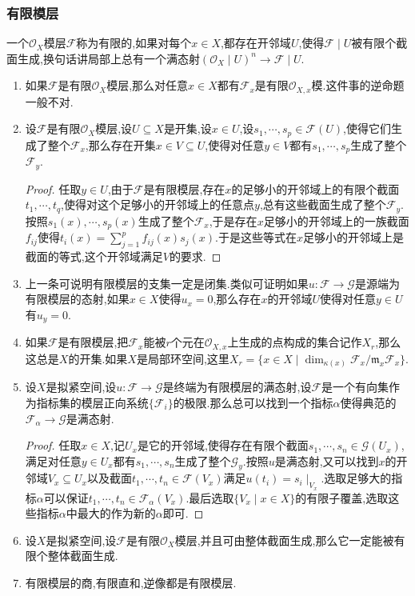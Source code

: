 \subsubsection{有限模层}

一个$\mathscr{O}_X$模层$\mathscr{F}$称为有限的,如果对每个$x\in X$,都存在开邻域$U$,使得$\mathscr{F}\mid U$被有限个截面生成,换句话讲局部上总有一个满态射$(\mathscr{O}_X\mid U)^n\to\mathscr{F}\mid U$.
\begin{enumerate}
	\item 如果$\mathscr{F}$是有限$\mathscr{O}_X$模层,那么对任意$x\in X$都有$\mathscr{F}_x$是有限$\mathscr{O}_{X,x}$模.这件事的逆命题一般不对.
	\item 设$\mathscr{F}$是有限$\mathscr{O}_X$模层,设$U\subseteq X$是开集,设$x\in U$,设$s_1,\cdots,s_p\in\mathscr{F}(U)$,使得它们生成了整个$\mathscr{F}_x$,那么存在开集$x\in V\subseteq U$,使得对任意$y\in V$都有$s_1,\cdots,s_p$生成了整个$\mathscr{F}_y$.
	\begin{proof}
		
		任取$y\in U$,由于$\mathscr{F}$是有限模层,存在$x$的足够小的开邻域上的有限个截面$t_1,\cdots,t_q$,使得对这个足够小的开邻域上的任意点$y$,总有这些截面生成了整个$\mathscr{F}_y$.按照$s_1(x),\cdots,s_p(x)$生成了整个$\mathscr{F}_x$,于是存在$x$足够小的开邻域上的一族截面$f_{ij}$使得$t_i(x)=\sum_{j=1}^pf_{ij}(x)s_j(x)$.于是这些等式在$x$足够小的开邻域上是截面的等式,这个开邻域满足$V$的要求.
	\end{proof}
	\item 上一条可说明有限模层的支集一定是闭集.类似可证明如果$u:\mathscr{F}\to\mathscr{G}$是源端为有限模层的态射,如果$x\in X$使得$u_x=0$,那么存在$x$的开邻域$U$使得对任意$y\in U$有$u_y=0$.
	\item 如果$\mathscr{F}$是有限模层,把$\mathscr{F}_x$能被$r$个元在$\mathscr{O}_{X,x}$上生成的点构成的集合记作$X_r$,那么这总是$X$的开集.如果$X$是局部环空间,这里$X_r=\{x\in X\mid\dim_{\kappa(x)}\mathscr{F}_x/\mathfrak{m}_x\mathscr{F}_x\}$.
	\item 设$X$是拟紧空间,设$u:\mathscr{F}\to\mathscr{G}$是终端为有限模层的满态射,设$\mathscr{F}$是一个有向集作为指标集的模层正向系统$\{\mathscr{F}_i\}$的极限.那么总可以找到一个指标$\alpha$使得典范的$\mathscr{F}_{\alpha}\to\mathscr{G}$是满态射.
	\begin{proof}
		
		任取$x\in X$,记$U_x$是它的开邻域,使得存在有限个截面$s_1,\cdots,s_n\in\mathscr{G}(U_x)$,满足对任意$y\in U_x$都有$s_1,\cdots,s_n$生成了整个$\mathscr{G}_y$.按照$u$是满态射,又可以找到$x$的开邻域$V_x\subseteq U_x$以及截面$t_1,\cdots,t_n\in\mathscr{F}(V_x)$满足$u(t_i)=s_i\mid_{V_x}$.选取足够大的指标$\alpha$可以保证$t_1,\cdots,t_n\in\mathscr{F}_{\alpha}(V_x)$.最后选取$\{V_x\mid x\in X\}$的有限子覆盖,选取这些指标$\alpha$中最大的作为新的$\alpha$即可.
	\end{proof}
	\item 设$X$是拟紧空间,设$\mathscr{F}$是有限$\mathscr{O}_X$模层,并且可由整体截面生成,那么它一定能被有限个整体截面生成.
	\item 有限模层的商,有限直和,逆像都是有限模层.
\end{enumerate}

